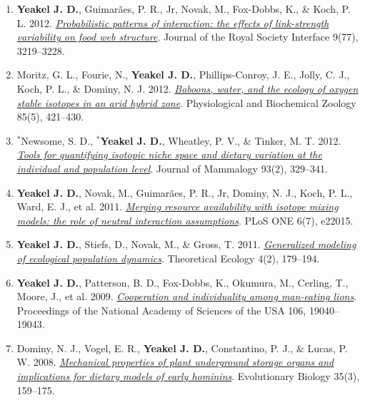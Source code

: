\documentclass[margin,line,12pt]{res}
\begin{document}
\begin{resume}
\begin{enumerate}
\item \textbf{Yeakel J. D.}, Guimar\~aes, P. R., Jr, Novak, M., Fox-Dobbs, K., \& Koch, P. L. 2012. \href{https://royalsocietypublishing.org/doi/10.1098/rsif.2012.0481}{\emph{Probabilistic patterns of interaction: the effects of link-strength variability on food web structure}}. Journal of the Royal Society Interface 9(77), 3219–3228.

\item Moritz, G. L., Fourie, N., \textbf{Yeakel J. D.}, Phillips-Conroy, J. E., Jolly, C. J., Koch, P. L., \& Dominy, N. J. 2012. \href{https://pubmed.ncbi.nlm.nih.gov/22902370/}{\emph{Baboons, water, and the ecology of oxygen stable isotopes in an arid hybrid zone}}. Physiological and Biochemical Zoology 85(5), 421–430.

\item ${}^\ast$Newsome, S. D., \textbf{${}^\ast$Yeakel J. D.}, Wheatley, P. V., \& Tinker, M. T. 2012. \href{https://academic.oup.com/jmammal/article/93/2/329/919625}{\emph{Tools for quantifying isotopic niche space and dietary variation at the individual and population level}}. Journal of Mammalogy 93(2), 329–341.

\item \textbf{Yeakel J. D.}, Novak, M., Guimar\~aes, P. R., Jr, Dominy, N. J., Koch, P. L., Ward, E. J., et al. 2011. \href{https://journals.plos.org/plosone/article?id=10.1371/journal.pone.0022015}{\emph{Merging resource availability with isotope mixing models: the role of neutral interaction assumptions}}. PLoS ONE 6(7), e22015.

\item \textbf{Yeakel J. D.}, Stiefs, D., Novak, M., \& Gross, T. 2011. \href{https://link.springer.com/article/10.1007/s12080-011-0112-6}{\emph{Generalized modeling of ecological population dynamics}}. Theoretical Ecology 4(2), 179–194.

\item \textbf{Yeakel J. D.}, Patterson, B. D., Fox-Dobbs, K., Okumura, M., Cerling, T., Moore, J., et al. 2009. \href{https://www.pnas.org/content/106/45/19040}{\emph{Cooperation and individuality among man-eating lions}}. Proceedings of the National Academy of Sciences of the USA 106, 19040–19043.

\item Dominy, N. J., Vogel, E. R., \textbf{Yeakel J. D.}, Constantino, P. J., \& Lucas, P. W. 2008. \href{https://link.springer.com/article/10.1007/s11692-008-9026-7}{\emph{Mechanical properties of plant underground storage organs and implications for dietary models of early hominins}}. Evolutionary Biology 35(3), 159–175.


\end{enumerate}
\end{resume}
\end{document}
